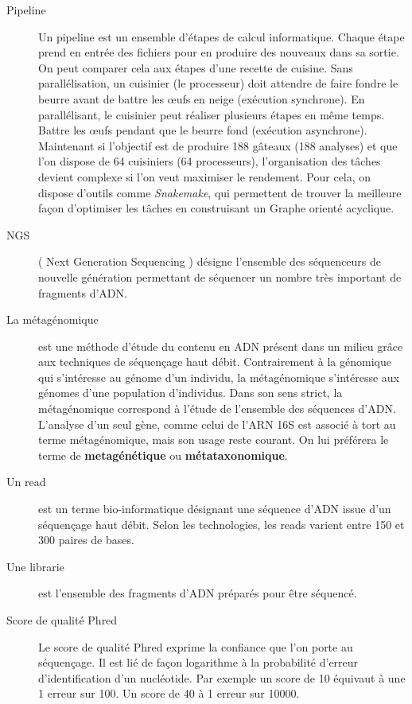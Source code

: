 \documentclass[12pt,a4paper]{article}
\begin{document}
\begin{description}
\item[Pipeline] 
Un pipeline est un ensemble d'étapes de calcul informatique. Chaque étape prend en entrée des fichiers pour en produire des nouveaux dans sa sortie. On peut comparer cela aux étapes d'une recette de cuisine. Sans parallélisation, un cuisinier (le processeur) doit attendre de faire fondre le beurre avant de battre les œufs en neige (exécution synchrone). En parallélisant, le cuisinier peut réaliser plusieurs étapes en même temps. Battre les œufs pendant que le beurre fond (exécution asynchrone). 
Maintenant si l'objectif est de produire 188 gâteaux (188 analyses) et que l'on dispose de 64 cuisiniers (64 processeurs), l'organisation des tâches devient complexe si l'on veut maximiser le rendement. Pour cela, on dispose d'outils comme \textit{Snakemake}\cite{Koster2012}, qui permettent de trouver la meilleure façon d'optimiser les tâches en construisant un Graphe orienté acyclique.

\item[NGS]( Next Generation Sequencing ) désigne l'ensemble des séquenceurs de nouvelle génération permettant de séquencer un nombre très important de fragments d'ADN. 

\item[La métagénomique] est une méthode d’étude du contenu en ADN présent dans un milieu grâce aux techniques de séquençage haut débit. Contrairement à la génomique qui s’intéresse au génome d’un individu, la métagénomique s’intéresse aux génomes d’une population d’individus.
Dans son sens strict, la métagénomique correspond à l’étude de l’ensemble des séquences d'ADN. L’analyse d’un seul gène, comme celui de l’ARN 16S est associé à tort au terme métagénomique, mais son usage reste courant. On lui préférera le terme de \textbf{metagénétique} ou \textbf{métataxonomique}.


\item[Un read] est un terme bio-informatique désignant une séquence d’ADN issue d’un séquençage haut débit. Selon les technologies, les reads varient entre 150 et 300 paires de bases.

\item[Une librarie] est l'ensemble des fragments d'ADN préparés pour être séquencé. 

\item[Score de qualité Phred] Le score de qualité Phred exprime la confiance que l'on porte au séquençage. Il est lié de façon logarithme à la probabilité d'erreur d'identification d'un nucléotide. Par exemple un score de 10 équivaut à une 1 erreur sur 100. Un score de 40 à 1 erreur sur 10000.


\end{description}
\end{document}
